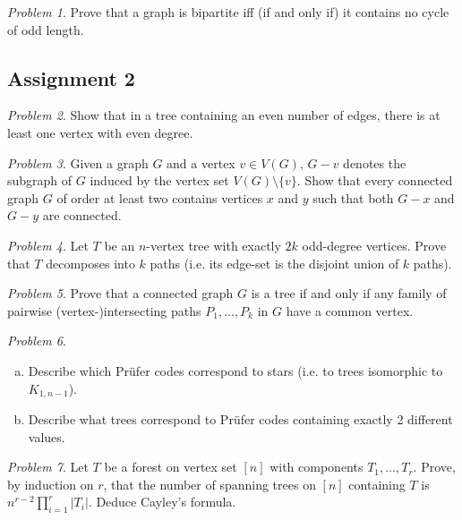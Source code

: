 \documentclass[10pt, fleqn, a4paper, landscape]{article}
\theoremstyle{plain} %
\theoremstyle{remark} %
\newtheorem{problem}{Problem}
\theoremstyle{definition} %
\begin{document}
\begin{multicols}{3}
\begin{tiny}
\begin{problem}
Prove that a graph is bipartite iff (if and only if) it contains no cycle of odd length.
\end{problem}

\subsection{Assignment 2}

\begin{problem}
Show that in a tree containing an even number of edges, there is at least one
vertex with even degree.
\end{problem}

\begin{problem}
Given a graph $G$ and a vertex $v \in V (G)$, $G - v$ denotes the subgraph of $G$ induced by the vertex set $V (G)\setminus\{v\}$. Show that every connected graph $G$ of order at least two contains vertices $x$ and $y$ such that both $G- x$ and $G-y$ are connected.
\end{problem}

\begin{problem}
Let $T$ be an $n$-vertex tree with exactly $2k$ odd-degree vertices. Prove that $T$ decomposes into $k$ paths (i.e. its edge-set is the disjoint union of $k$ paths).
\end{problem}

\begin{problem}
Prove that a connected graph $G$ is a tree if and only if any family of pairwise (vertex-)intersecting paths $P_1,\dots,P_k$ in $G$ have a common vertex.
\end{problem}

\begin{problem}
\begin{enumerate}[(a)]
\item Describe which Prüfer codes correspond to stars (i.e. to trees isomorphic to $K_{1,n-1}$).
\item Describe what trees correspond to Prüfer codes containing exactly 2 different values.
\end{enumerate}
\end{problem}

\begin{problem}
Let $T$ be a forest on vertex set $[n]$ with components $T_1,\dots,T_r$. Prove, by induction on $r$, that the number of spanning trees on $[n]$ containing $T$ is $n^{r-2}\prod_{i=1}^{r}|T_i|$. Deduce Cayley's formula.
\end{problem}


\end{tiny}
\end{multicols}
\end{document}
